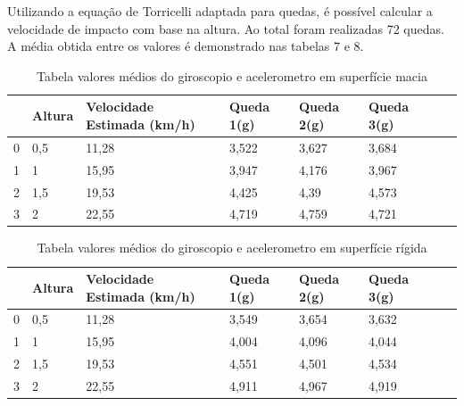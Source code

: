 Utilizando a equação de Torricelli adaptada para quedas, é possível calcular a velocidade de impacto com base na altura. Ao total foram realizadas 72 quedas. A média obtida entre os valores é demonstrado nas tabelas 7 e 8.

\begin{table}[H]
    \centering
    \caption{Tabela valores médios do giroscopio e acelerometro em superfície macia}
    \begin{tabular*}{\textwidth}{l@{\extracolsep{\fill}}lllllll}
\toprule
{} &                 Altura  &       Velocidade Estimada (km/h) & Queda 1(g) & Queda 2(g) & Queda 3(g) \\
\midrule
0 &              0,5     &   11,28      &        3,522 &                    3,627 &                    3,684  \\
1 &              1 &         15,95 &                    3,947 &                    4,176 &                     3,967  \\
2 &  1,5 &  19,53 &                    4,425 &                    4,39 &                    4,573 \\
3 &  2 &         22,55 &                    4,719 &                    4,759 &                    4,721  \\
\bottomrule
\end{tabular*}


\end{table}


\begin{table}[H]
    \centering
    \caption{Tabela valores médios do giroscopio e acelerometro em superfície rígida}
    \begin{tabular*}{\textwidth}{l@{\extracolsep{\fill}}lllllll}
\toprule
{} &                 Altura  &       Velocidade Estimada (km/h) & Queda 1(g) & Queda 2(g) & Queda 3(g) \\
\midrule
0 &              0,5     &   11,28      &        3,549 &                    3,654 &                    3,632  \\
1 &              1 &         15,95 &                    4,004 &                    4,096 &                     4,044  \\
2 &  1,5 &  19,53 &                    4,551 &                    4,501 &                    4,534 \\
3 &  2 &         22,55 &                    4,911 &                    4,967 &                    4,919  \\
\bottomrule
\end{tabular*}

\end{table}

